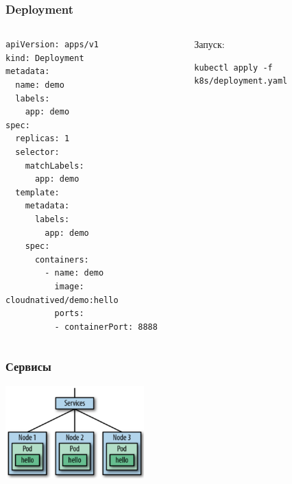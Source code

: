 \documentclass{../../slides-style}
\begin{document}
    \begin{frame}[fragile]
        \frametitle{Deployment}
        \begin{columns}
            \begin{column}{0.4\textwidth}
                \begin{scriptsize}
                    \begin{verbatim}
apiVersion: apps/v1
kind: Deployment
metadata:
  name: demo
  labels:
    app: demo
spec:
  replicas: 1
  selector:
    matchLabels:
      app: demo
  template:
    metadata:
      labels:
        app: demo
    spec:
      containers:
        - name: demo
          image: cloudnatived/demo:hello
          ports:
          - containerPort: 8888
                    \end{verbatim}
                \end{scriptsize}
            \end{column}
            \begin{column}{0.6\textwidth}
                Запуск:
                \begin{verbatim}
kubectl apply -f k8s/deployment.yaml
                \end{verbatim}
            \end{column}
        \end{columns}
    \end{frame}

    \begin{frame}
        \frametitle{Сервисы}
        \begin{center}
            \includegraphics[width=0.4\textwidth]{kubernetesServices.png}
        \end{center}
    \end{frame}
\end{document}
